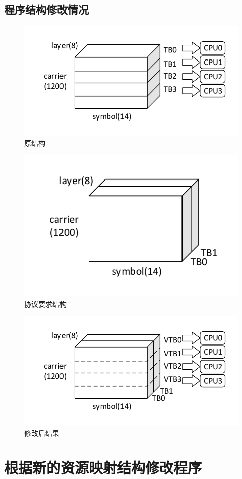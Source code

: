 \documentclass{article}
\begin{document}
\subsection{程序结构修改情况}
\begin{figure}[H]
	\centering
	\includegraphics[width = .7\textwidth]{str1.pdf}
	\caption{原结构}
\end{figure}
\begin{figure}[H]
	\centering
	\includegraphics[width = .55\textwidth]{str2.pdf}
	\caption{协议要求结构}
\end{figure}
\begin{figure}[H]
	\centering
	\includegraphics[width = .7\textwidth]{str3.pdf}
	\caption{修改后结果}
\end{figure}

\section{根据新的资源映射结构修改程序}
\end{document}

